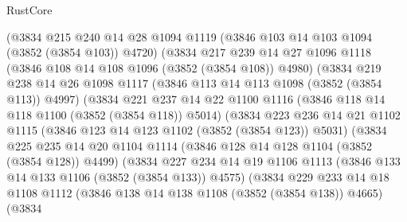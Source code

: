 \begin{lexlean}{RustCore}
\begin{coremodule}
                    (@3834
                      @215
                      @240
                      @14
                      @28
                      @1094
                      @1119
                      (@3846 @103 @14 @103 @1094 (@3852 (@3854 @103)) @4720)
                      (@3834
                        @217
                        @239
                        @14
                        @27
                        @1096
                        @1118
                        (@3846 @108 @14 @108 @1096 (@3852 (@3854 @108)) @4980)
                        (@3834
                          @219
                          @238
                          @14
                          @26
                          @1098
                          @1117
                          (@3846 @113 @14 @113 @1098 (@3852 (@3854 @113)) @4997)
                          (@3834
                            @221
                            @237
                            @14
                            @22
                            @1100
                            @1116
                            (@3846 @118 @14 @118 @1100 (@3852 (@3854 @118)) @5014)
                            (@3834
                              @223
                              @236
                              @14
                              @21
                              @1102
                              @1115
                              (@3846 @123 @14 @123 @1102 (@3852 (@3854 @123)) @5031)
                              (@3834
                                @225
                                @235
                                @14
                                @20
                                @1104
                                @1114
                                (@3846 @128 @14 @128 @1104 (@3852 (@3854 @128)) @4499)
                                (@3834
                                  @227
                                  @234
                                  @14
                                  @19
                                  @1106
                                  @1113
                                  (@3846 @133 @14 @133 @1106 (@3852 (@3854 @133)) @4575)
                                  (@3834
                                    @229
                                    @233
                                    @14
                                    @18
                                    @1108
                                    @1112
                                    (@3846 @138 @14 @138 @1108 (@3852 (@3854 @138)) @4665)
                                    (@3834

\end{coremodule}
\end{lexlean}
